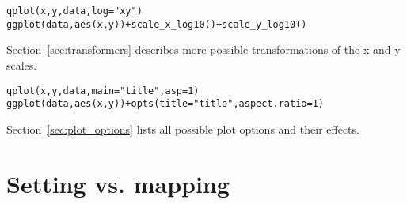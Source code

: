 \begin{alltt}
qplot(x, y, data, log="xy")
ggplot(data, aes(x, y)) + scale_x_log10() + scale_y_log10()
\end{alltt}

Section~\ref{sec:transformers} describes more possible transformations of the x and y scales.

\begin{alltt}
qplot(x, y, data, main="title", asp = 1)
ggplot(data, aes(x, y)) + opts(title = "title", aspect.ratio = 1)
\end{alltt}

Section~\ref{sec:plot_options} lists all possible plot options and their effects.



% 
% 
% 
% 
% 
% 
% 
% 
% 


\section{Setting vs. mapping}
\label{ref:setting-mapping}

